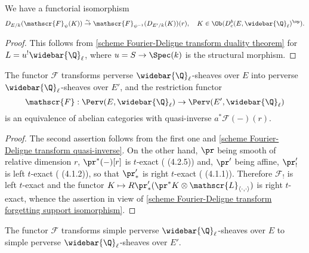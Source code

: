 \begin{corollary}
We have a functorial isomorphism
\[D_{E/k}(\mathscr{F}_\psi(K))\stackrel{\sim}{\to}\mathscr{F}_{\psi^{-1}}(D_{E'/k}(K))(r),\quad K\in\Ob(D^b_c(E,\widebar{\Q}_\ell)^{\op}).\]
\end{corollary}
\begin{proof}
This follows from \cref{scheme Fourier-Deligne transform duality theorem} for $L=u^!\widebar{\Q}_\ell$, where $u=S\to\Spec(k)$ is the structural morphism.
\end{proof}

\begin{theorem}\label{scheme Fourier-Deligne transform preserve perverse}
The functor $\mathscr{F}$ transforms perverse $\widebar{\Q}_\ell$-sheaves over $E$ into perverse $\widebar{\Q}_\ell$-sheaves over $E'$, and the restriction functor
\[\mathscr{F}:\Perv(E,\widebar{\Q}_\ell)\to\Perv(E',\widebar{\Q}_\ell)\]
is an equivalence of abelian categories with quasi-inverse $a^*\mathscr{F}(-)(r)$.
\end{theorem}
\begin{proof}
The second assertion follows from the first one and \cref{scheme Fourier-Deligne transform quasi-inverse}. On the other hand, $\pr$ being smooth of relative dimension $r$, $\pr^*(-)[r]$ is $t$-exact (\cite{BBD} (4.2.5)) and, $\pr'$ being affine, $\pr'_!$ is left $t$-exact (\cite{BBD} (4.1.2)), so that $\pr'_*$ is right $t$-exact (\cite{BBD} (4.1.1)). Therefore $\mathscr{F}_!$ is left $t$-exact and the functor $K\mapsto R\pr'_*(\pr^*K\otimes\mathscr{L}_{\langle\cdot,\cdot\rangle})$ is right $t$-exact, whence the assertion in view of \cref{scheme Fourier-Deligne transform forgetting support isomorphism}. 
\end{proof}

\begin{corollary}
The functor $\mathscr{F}$ transforms simple perverse $\widebar{\Q}_\ell$-sheaves over $E$ to simple perverse $\widebar{\Q}_\ell$-sheaves over $E'$.
\end{corollary}
